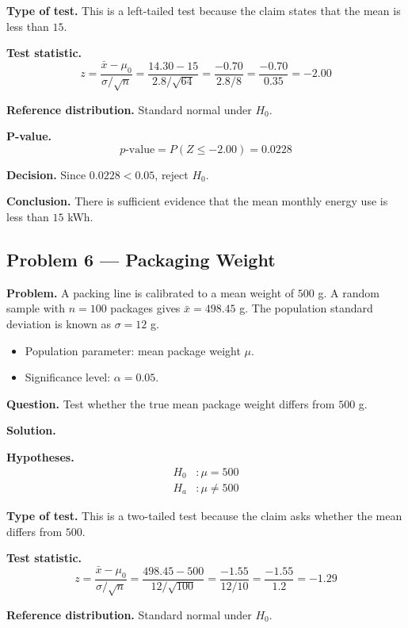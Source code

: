 \begin{ExamProblems}
\textbf{Type of test.} This is a left-tailed test because the claim states that the mean is less than \(15\).

\textbf{Test statistic.}
\[
z = \frac{\bar{x}-\mu_0}{\sigma/\sqrt{n}} = \frac{14.30-15}{2.8/\sqrt{64}} = \frac{-0.70}{2.8/8} = \frac{-0.70}{0.35} = -2.00
\]

\textbf{Reference distribution.} Standard normal under \(H_0\).

\textbf{P-value.}
\[
p\text{-value}=P(Z\le -2.00)=0.0228
\]

\textbf{Decision.} Since \(0.0228<0.05\), reject \(H_0\).

\textbf{Conclusion.} There is sufficient evidence that the mean monthly energy use is less than \(15\) kWh.

\hypertarget{c5-ex6}{}
\item
\subsection*{Problem 6 — Packaging Weight}

\textbf{Problem.} A packing line is calibrated to a mean weight of \(500\) g. A random sample with \(n=100\) packages gives \(\bar{x}=498.45\) g. The population standard deviation is known as \(\sigma=12\) g.
\begin{itemize}
    \item Population parameter: mean package weight \(\mu\).
    \item Significance level: \(\alpha=0.05\).
\end{itemize}

\textbf{Question.} Test whether the true mean package weight differs from \(500\) g.

\textbf{Solution.}

\textbf{Hypotheses.}
\[
\begin{aligned}
H_0&: \mu = 500 \\
H_a&: \mu \ne 500
\end{aligned}
\]

\textbf{Type of test.} This is a two-tailed test because the claim asks whether the mean differs from \(500\).

\textbf{Test statistic.}
\[
z = \frac{\bar{x}-\mu_0}{\sigma/\sqrt{n}} = \frac{498.45-500}{12/\sqrt{100}} = \frac{-1.55}{12/10} = \frac{-1.55}{1.2} = -1.29
\]

\textbf{Reference distribution.} Standard normal under \(H_0\).


\end{ExamProblems}
